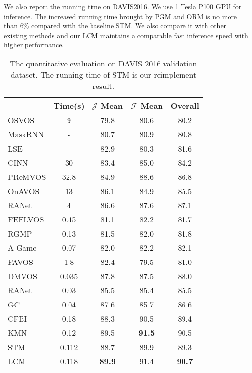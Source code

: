 \documentclass[final]{cvpr}
\begin{document}
We also report the running time on DAVIS2016. We use 1 Tesla P100 GPU for inference. The increased running time brought by PGM and ORM is no more than 6\% compared with the baseline STM. We also compare it with other existing methods and our LCM maintains a comparable fast inference speed with higher performance.


\begin{table}
	\centering
	
\begin{center}
\begin{tabular}{lcccc} 
\hline
 & Time(s) & $\mathcal{J}$ Mean & $\mathcal{F}$ Mean & Overall \\
\hline
OSVOS\cite{osvos} & 9 & 79.8 & 80.6 & 80.2 \\
MaskRNN\cite{maskrnn} & - & 80.7 & 80.9 & 80.8 \\  
LSE\cite{LSE} & - & 82.9 & 80.3 &  81.6 \\
CINN\cite{cinn} & 30 & 83.4 & 85.0 & 84.2 \\
PReMVOS\cite{premvos} & 32.8 & 84.9 & 88.6 & 86.8 \\
OnAVOS\cite{OnAVOS} & 13 & 86.1 & 84.9 &  85.5 \\
RANet\cite{ranet}   & 4 &  86.6 &  87.6 & 87.1 \\
FEELVOS\cite{feelvos} & 0.45   & 81.1 &  82.2 &  81.7 \\
RGMP\cite{rgmp} & 0.13 & 81.5 & 82.0 &  81.8 \\
A-Game\cite{agame} & 0.07 &  82.0 & 82.2 & 82.1 \\
FAVOS\cite{favos} & 1.8 &  82.4 &  79.5 &  81.0 \\
DMVOS\cite{dmvos} & 0.035 & 87.8 & 87.5 & 88.0\\
RANet\cite{ranet}   & 0.03 &  85.5 & 85.4 & 85.5 \\ 
GC\cite{GC}   & 0.04 &  87.6 & 85.7 &  86.6 \\
CFBI\cite{cfbi} & 0.18 &  88.3 & 90.5 &  89.4 \\

KMN\cite{KMN}  & 0.12 &  89.5 & \textbf{91.5} & 90.5 \\

\hline
STM\cite{STM} & 0.112 & 88.7 & 89.9 &  89.3 \\ 
LCM   & 0.118 & \textbf{89.9} & 91.4 & \textbf{90.7}  \\
\hline
\end{tabular}
\end{center} 	\caption{The quantitative evaluation on DAVIS-2016 validation dataset. The running time of STM is our reimplement result.}
	\label{table:davis2016}
\end{table}
\end{document}
